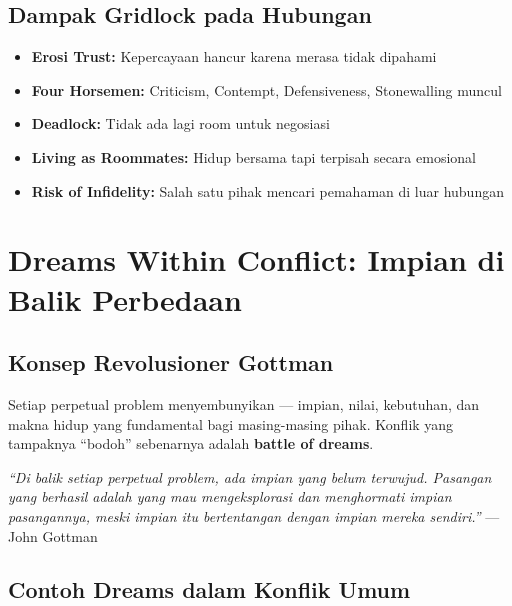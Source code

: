 \subsection{Dampak Gridlock pada Hubungan}

\begin{itemize}
    \item \textbf{Erosi Trust:} Kepercayaan hancur karena merasa tidak dipahami
    \item \textbf{Four Horsemen:} Criticism, Contempt, Defensiveness, Stonewalling muncul
    \item \textbf{Deadlock:} Tidak ada lagi room untuk negosiasi
    \item \textbf{Living as Roommates:} Hidup bersama tapi terpisah secara emosional
    \item \textbf{Risk of Infidelity:} Salah satu pihak mencari pemahaman di luar hubungan
\end{itemize}

\section{Dreams Within Conflict: Impian di Balik Perbedaan}

\subsection{Konsep Revolusioner Gottman}

Setiap perpetual problem menyembunyikan  --- impian, nilai, kebutuhan, dan makna hidup yang fundamental bagi masing-masing pihak. Konflik yang tampaknya ``bodoh'' sebenarnya adalah \textbf{battle of dreams}.

\begin{insightbox}
\textit{``Di balik setiap perpetual problem, ada impian yang belum terwujud. Pasangan yang berhasil adalah yang mau mengeksplorasi dan menghormati impian pasangannya, meski impian itu bertentangan dengan impian mereka sendiri.''} --- John Gottman
\end{insightbox}

\subsection{Contoh Dreams dalam Konflik Umum}

